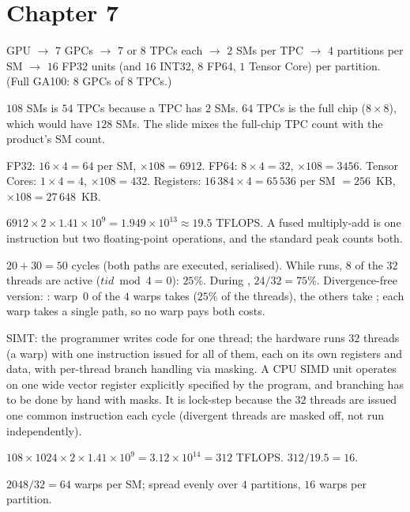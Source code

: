 \section*{Chapter 7}
\begin{description}[leftmargin=1.2cm,labelwidth=1cm,itemsep=3pt]
  \item[7.1] GPU $\to$ $7$ GPCs $\to$ $7$ or $8$ TPCs each $\to$ $2$ SMs per TPC $\to$ $4$ partitions per SM $\to$ $16$ FP32 units (and $16$ INT32, $8$ FP64, $1$ Tensor Core) per partition. (Full GA100: $8$ GPCs of $8$ TPCs.)
  \item[7.2] $108$ SMs is $54$ TPCs because a TPC has $2$ SMs. $64$ TPCs is the full chip ($8\times8$), which would have $128$ SMs. The slide mixes the full-chip TPC count with the product's SM count.
  \item[7.3] FP32: $16\times4=64$ per SM, $\times108=6912$. FP64: $8\times4=32$, $\times108=3456$. Tensor Cores: $1\times4=4$, $\times108=432$. Registers: $16\,384\times4=65\,536$ per SM $=256$~KB, $\times108=27\,648$~KB.
  \item[7.4] $6912\times2\times1.41\times10^{9}=1.949\times10^{13}\approx19.5$ TFLOPS. A fused multiply-add is one instruction but two floating-point operations, and the standard peak counts both.
  \item[7.5] $20+30=50$ cycles (both paths are executed, serialised). While  runs, $8$ of the $32$ threads are active ($tid\bmod4=0$): $25\%$. During , $24/32=75\%$. Divergence-free version: : warp~0 of the $4$ warps takes  ($25\%$ of the threads), the others take ; each warp takes a single path, so no warp pays both costs.
  \item[7.6] SIMT: the programmer writes code for one thread; the hardware runs $32$ threads (a warp) with one instruction issued for all of them, each on its own registers and data, with per-thread branch handling via masking. A CPU SIMD unit operates on one wide vector register explicitly specified by the program, and branching has to be done by hand with masks. It is lock-step because the $32$ threads are issued one common instruction each cycle (divergent threads are masked off, not run independently).
  \item[7.7] $108\times1024\times2\times1.41\times10^{9}=3.12\times10^{14}=312$ TFLOPS. $312/19.5=16$.
  \item[7.8] $2048/32=64$ warps per SM; spread evenly over $4$ partitions, $16$ warps per partition.
\end{description}

